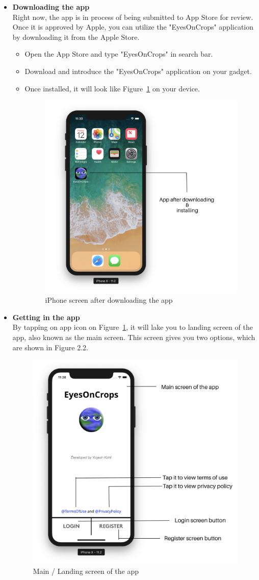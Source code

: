 \begin{itemize}
    \item \textbf{Downloading the app} \\
    Right now, the app is in process of being submitted to App Store for review. Once it is approved by Apple, you can utilize the "EyesOnCrops" application by downloading it from the Apple Store. 
    
    \begin{itemize}
        \item Open the App Store and type "EyesOnCrops" in search bar.
        \item Download and introduce the "EyesOnCrops" application on your gadget.
        \item Once installed, it will look like Figure~\ref{fig:app_icon_screen} on your device.
        
        \begin{figure}[H]
            \centering
            \includegraphics[width=0.50\linewidth]{figures/ch2/app_icon_screen.png}
            \caption{\label{fig:app_icon_screen} iPhone screen after downloading the app}
        \end{figure}
    \end{itemize}
    
    \item \textbf{Getting in the app} \\
    By tapping on app icon on Figure~\ref{fig:app_icon_screen}, it will lake you to landing screen of the app, also known as the main screen. This screen gives you two options, which are shown in Figure 2.2.
     
        \begin{figure}[H]
            \centering
            \includegraphics[width=0.50\linewidth]{figures/ch2/main_screen.png}
            \caption{\label{fig:main_screen} Main / Landing screen of the app}
        \end{figure}


\end{itemize}
